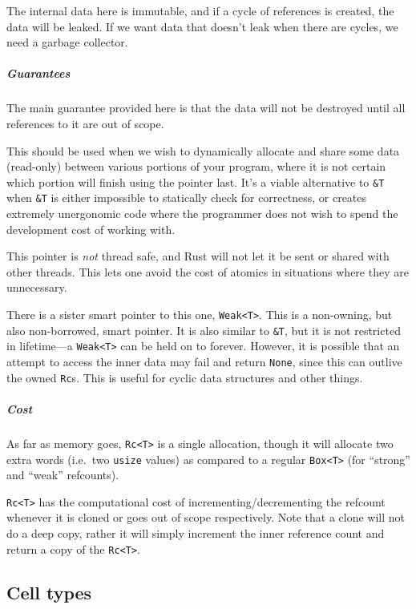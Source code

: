 \documentclass[a4paper,]{book}
\let\oldsubparagraph\subparagraph
\renewcommand{\subparagraph}[1]{\oldsubparagraph{#1}\mbox{}}
\begin{document}
The internal data here is immutable, and if a cycle of references is
created, the data will be leaked. If we want data that doesn't leak when
there are cycles, we need a garbage collector.

\subparagraph{Guarantees}\label{guarantees}

The main guarantee provided here is that the data will not be destroyed
until all references to it are out of scope.

This should be used when we wish to dynamically allocate and share some
data (read-only) between various portions of your program, where it is
not certain which portion will finish using the pointer last. It's a
viable alternative to \texttt{\&T} when \texttt{\&T} is either
impossible to statically check for correctness, or creates extremely
unergonomic code where the programmer does not wish to spend the
development cost of working with.

This pointer is \emph{not} thread safe, and Rust will not let it be sent
or shared with other threads. This lets one avoid the cost of atomics in
situations where they are unnecessary.

There is a sister smart pointer to this one,
\texttt{Weak\textless{}T\textgreater{}}. This is a non-owning, but also
non-borrowed, smart pointer. It is also similar to \texttt{\&T}, but it
is not restricted in lifetime---a
\texttt{Weak\textless{}T\textgreater{}} can be held on to forever.
However, it is possible that an attempt to access the inner data may
fail and return \texttt{None}, since this can outlive the owned
\texttt{Rc}s. This is useful for cyclic data structures and other
things.

\subparagraph{Cost}\label{cost}

As far as memory goes, \texttt{Rc\textless{}T\textgreater{}} is a single
allocation, though it will allocate two extra words (i.e.~two
\texttt{usize} values) as compared to a regular
\texttt{Box\textless{}T\textgreater{}} (for ``strong'' and ``weak''
refcounts).

\texttt{Rc\textless{}T\textgreater{}} has the computational cost of
incrementing/decrementing the refcount whenever it is cloned or goes out
of scope respectively. Note that a clone will not do a deep copy, rather
it will simply increment the inner reference count and return a copy of
the \texttt{Rc\textless{}T\textgreater{}}.

\subsection{Cell types}\label{cell-types}
\end{document}
